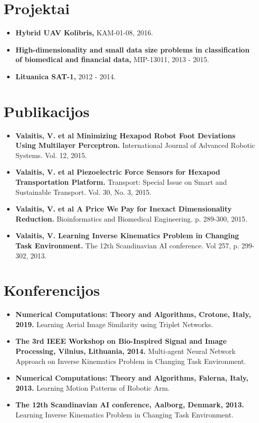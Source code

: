 \documentclass[letterpaper,11pt]{report}
\newcommand{\resumeItem}[2]{
  \item\small{
    \textbf{#1}{ #2 \vspace{-2pt}}
  }
}
\newcommand{\resumeSubItem}[2]{\resumeItem{#1}{#2}\vspace{-4pt}}
\newcommand{\resumeSubHeadingListStart}{\begin{itemize}[leftmargin=*] \renewcommand\labelitemi{$\circ$}}
\newcommand{\resumeSubHeadingListEnd}{\end{itemize}}
\begin{document}
\section{Projektai}
  \resumeSubHeadingListStart
    \resumeSubItem{Hybrid UAV Kolibris,}{KAM-01-08, 2016.}
    \resumeSubItem{High-dimensionality and small data size problems in classification of biomedical and financial data,}{MIP-13011, 2013 - 2015.}
    \resumeSubItem{Lituanica SAT-1,}{2012 - 2014.}
  \resumeSubHeadingListEnd

\section{Publikacijos}
    \resumeSubHeadingListStart
    \resumeSubItem{Valaitis, V. et al Minimizing Hexapod Robot Foot Deviations Using Multilayer Perceptron.}{International Journal of Advanced Robotic Systems. Vol. 12, 2015.}
    \resumeSubItem{Valaitis, V. et al Piezoelectric Force Sensors for Hexapod Transportation Platform.}{Transport: Special Issue on Smart and Sustainable Transport. Vol. 30, No. 3, 2015.}
    \resumeSubItem{Valaitis, V. et al A Price We Pay for Inexact Dimensionality Reduction.}{Bioinformatics and Biomedical Engineering. p. 289-300, 2015.}
    \resumeSubItem{Valaitis, V. Learning Inverse Kinematics Problem in Changing Task Environment.}{The 12th Scandinavian AI conference. Vol 257, p. 299-302, 2013.}
  \resumeSubHeadingListEnd

\section{Konferencijos}
  \resumeSubHeadingListStart
    \resumeSubItem{Numerical Computations: Theory and Algorithms, Crotone, Italy, 2019.}{Learning Aerial Image Similarity using Triplet Networks.}
    \resumeSubItem{The 3rd IEEE Workshop  on Bio-Inspired Signal and Image Processing, Vilnius, Lithuania, 2014.}{Multi-agent Neural Network Approach on Inverse Kinematics Problem in Changing Task Environment.}
    \resumeSubItem{Numerical Computations: Theory and Algorithms, Falerna, Italy, 2013.}{Learning Motion Patterns of Robotic Arm.}
    \resumeSubItem{The 12th Scandinavian AI conference, Aalborg, Denmark, 2013.}{Learning Inverse Kinematics Problem in Changing Task Environment.}
  \resumeSubHeadingListEnd
\end{document}
